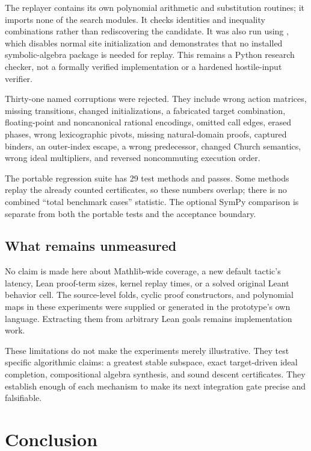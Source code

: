 The replayer contains its own polynomial arithmetic and substitution routines;
it imports none of the search modules. It checks identities and inequality
combinations rather than rediscovering the candidate. It was also run using
, which disables normal site initialization and demonstrates that
no installed symbolic-algebra package is needed for replay. This remains a
Python research checker, not a formally verified implementation or a hardened
hostile-input verifier.

Thirty-one named corruptions were rejected. They include wrong action matrices,
missing transitions, changed initializations, a fabricated target combination,
floating-point and noncanonical rational encodings, omitted call edges, erased
phases, wrong lexicographic pivots, missing natural-domain proofs, captured
binders, an outer-index escape, a wrong predecessor, changed Church semantics,
wrong ideal multipliers, and reversed noncommuting execution order.

The portable regression suite has 29 test methods and passes. Some methods
replay the already counted certificates, so these numbers overlap; there is no
combined ``total benchmark cases'' statistic. The optional SymPy comparison is
separate from both the portable tests and the acceptance boundary.

\subsection{What remains unmeasured}

No claim is made here about Mathlib-wide coverage, a new default tactic's latency,
Lean proof-term sizes, kernel replay times, or a solved original Leant behavior
cell. The source-level folds, cyclic proof constructors, and polynomial maps in
these experiments were supplied or generated in the prototype's own language.
Extracting them from arbitrary Lean goals remains implementation work.

These limitations do not make the experiments merely illustrative. They test
specific algorithmic claims: a greatest stable subspace, exact target-driven
ideal completion, compositional algebra synthesis, and sound descent certificates.
They establish enough of each mechanism to make its next integration gate
precise and falsifiable.

\section{Conclusion}

